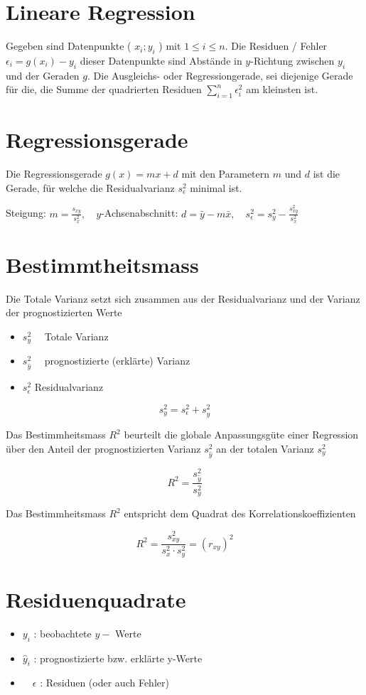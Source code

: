 \documentclass[10pt]{article}
\begin{document}
\section*{Lineare Regression}
Gegeben sind Datenpunkte ( $x_{i} ; y_{i}$ ) mit $1 \leq i \leq n$. Die Residuen / Fehler $\epsilon_{i}=g\left(x_{i}\right)-y_{i}$ dieser Datenpunkte sind Abstände in $y$-Richtung zwischen $y_{i}$ und der Geraden $g$. Die Ausgleichs- oder Regressiongerade, sei diejenige Gerade für die, die Summe der quadrierten Residuen $\sum_{i=1}^{n} \epsilon_{i}^{2}$ am kleinsten ist.

\section*{Regressionsgerade}
Die Regressionsgerade $g(x)=m x+d$ mit den Parametern $m$ und $d$ ist die Gerade, für welche die Residualvarianz $s_{\epsilon}^{2}$ minimal ist.

Steigung: $m=\frac{s_{x y}}{s_{x}^{2}}, \quad y$-Achsenabschnitt: $d=\bar{y}-m \bar{x}, \quad s_{\epsilon}^{2}=s_{y}^{2}-\frac{s_{x y}^{2}}{s_{x}^{2}}$

\section*{Bestimmtheitsmass}
Die Totale Varianz setzt sich zusammen aus der Residualvarianz und der Varianz der prognostizierten Werte

\begin{itemize}
  \item $s_{y}^{2} \quad$ Totale Varianz
  \item $s_{\hat{y}}^{2} \quad$ prognostizierte (erklärte) Varianz
  \item $s_{\epsilon}^{2}$ Residualvarianz
\end{itemize}

$$
s_{y}^{2}=s_{\epsilon}^{2}+s_{\hat{y}}^{2}
$$

Das Bestimmheitsmass $R^{2}$ beurteilt die globale Anpassungsgüte einer Regression über den Anteil der prognostizierten Varianz $s_{\hat{y}}^{2}$ an der totalen Varianz $s_{y}^{2}$

$$
R^{2}=\frac{s_{\hat{y}}^{2}}{s_{y}^{2}}
$$

Das Bestimmheitsmass $R^{2}$ entspricht dem Quadrat des Korrelationskoeffizienten

$$
R^{2}=\frac{s_{x y}^{2}}{s_{x}^{2} \cdot s_{y}^{2}}=\left(r_{x y}\right)^{2}
$$

\section*{Residuenquadrate}
\begin{itemize}
  \item $y_{i}$ : beobachtete $y-$ Werte
  \item $\hat{y}_{i}$ : prognostizierte bzw. erklärte y-Werte
  \item $\quad \epsilon$ : Residuen (oder auch Fehler)
\end{itemize}
\end{document}
